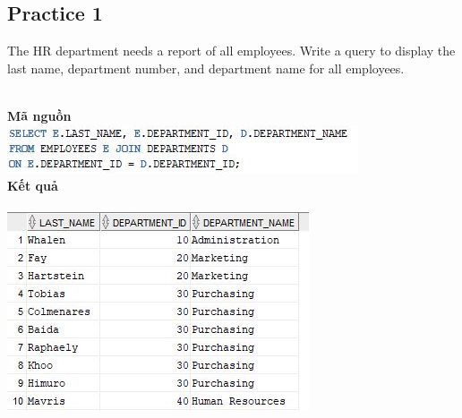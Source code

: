 \documentclass[12pt,a4paper]{report}
\begin{document}
\subsection{Practice 1}
\begin{boxedminipage}[t]{15.5cm}
	The HR department needs a report of all employees. Write a query to display the last name, 
	department number, and department name for all employees.
\end{boxedminipage}
\newline
\\
\textbf{Mã nguồn}
\\
\newline
\includegraphics[scale=1]{16.jpg}\\
\textbf{Kết quả}\\\\
\includegraphics[scale=1]{k16.jpg}
\end{document}
